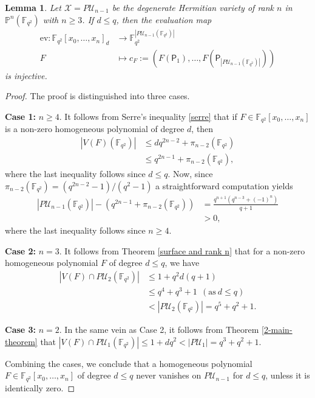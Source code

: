 \documentclass[10pt,a4paper,oneside]{amsproc}
\newtheorem{lemma}[theorem]{Lemma}
\newcommand{\ev}{\mathrm{ev}}
\newcommand{\Fqt}{\mathbb{F}_{q^2}}
\newcommand{\U}{\mathcal{U}}
\def\PP{{\mathbb P}}
\newcommand{\X}{\mathcal{X}}
\newcommand{\p}{\mathsf{P}}
\begin{document}
\begin{lemma}\label{inj}
  Let $\X=P\U_{n-1}$ be the degenerate Hermitian variety of rank $n$ in $\PP^n(\Fqt)$ with $n\geq 3$. If $d\leq q$, then the evaluation map 
\begin{align*}
  \ev: \Fqt[x_0,\dots,x_n]_d &\to \Fqt^{|P\U_{n-1}(\Fqt)|} \\
  F&\mapsto c_F:=\left(F\left(\p_1\right),\dots,F\left(\p_{|P\U_{n-1}(\Fqt)|}\right)\right)
\end{align*}
  is injective.
\end{lemma}
\begin{proof}
    The proof is distinguished into three cases.

    \textbf{Case 1:} $n\geq 4$.
It follows from Serre's inequality \ref{serre} that if $F\in\Fqt[x_0,\dots,x_n]$ is a non-zero homogeneous polynomial of degree $d$, then 
\begin{align*}
    |V(F)(\Fqt)|&\leq dq^{2n-2}+\pi_{n-2}(\Fqt)\\
                &\leq q^{2n-1}+\pi_{n-2}(\Fqt),        
\end{align*}
where the last inequality follows since $d\leq q$. Now, since $\pi_{n-2}(\Fqt)=(q^{2n-2}-1)/(q^2-1)$ a straightforward computation yields 
\begin{align*}
    |P\U_{n-1}(\Fqt)|- \left( q^{2n-1}+\pi_{n-2}(\Fqt)\right)&= \frac{q^{n+1}\left(q^{n-3}+(-1)^n\right)}{q+1}\\
                & > 0,
\end{align*}
where the last inequality follows since $n\geq 4$.

\textbf{Case 2:} $n=3$. It follows from Theorem \ref{surface and rank n} that for a non-zero homogeneous polynomial $F$ of degree $d\leq q$, we have
\begin{align*}
  |V(F)\cap P\U_2(\Fqt)|&\leq 1+q^2d(q+1)\\
                        &\leq q^4+q^3+1 \ \ (\text{as}\ d\leq q)\\
                        &< |P\U_2(\Fqt)|=q^5+q^2+1.
\end{align*}

\textbf{Case 3:} $n=2$. In the same vein as Case 2, it follows from Theorem \ref{2-main-theorem} that $|V(F)\cap P\U_1(\Fqt)|\leq 1+dq^2<|P\U_1|=q^3+q^2+1$.

Combining the cases, we conclude that a homogeneous polynomial $F\in \Fqt[x_0,\dots,x_n]$ of degree $d\leq q$ never vanishes on $P\U_{n-1}$ for $d\leq q$, unless it is identically zero. 
\end{proof}
\end{document}
